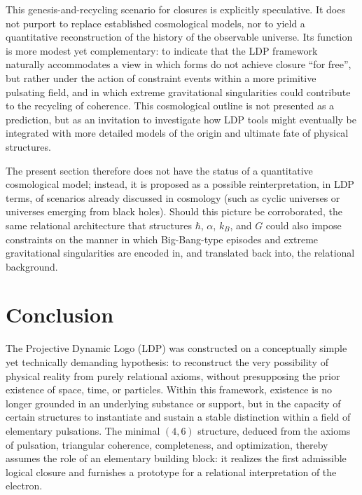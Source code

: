 \documentclass[11pt,a4paper]{article}
\begin{document}
This genesis-and-recycling scenario for closures is explicitly speculative. It does not purport to replace established cosmological models, nor to yield a quantitative reconstruction of the history of the observable universe. Its function is more modest yet complementary: to indicate that the LDP framework naturally accommodates a view in which forms do not achieve closure “for free”, but rather under the action of constraint events within a more primitive pulsating field, and in which extreme gravitational singularities could contribute to the recycling of coherence. This cosmological outline is not presented as a prediction, but as an invitation to investigate how LDP tools might eventually be integrated with more detailed models of the origin and ultimate fate of physical structures. 

The present section therefore does not have the status of a quantitative cosmological model; instead, it is proposed as a possible reinterpretation, in LDP terms, of scenarios already discussed in cosmology (such as cyclic universes or universes emerging from black holes). Should this picture be corroborated, the same relational architecture that structures \(\hbar\), \(\alpha\), \(k_{B}\), and \(G\) could also impose constraints on the manner in which Big-Bang-type episodes and extreme gravitational singularities are encoded in, and translated back into, the relational background.

\newpage

\section*{Conclusion}
The Projective Dynamic Logo (LDP) was constructed on a conceptually simple yet technically demanding hypothesis: to reconstruct the very possibility of physical reality from purely relational axioms, without presupposing the prior existence of space, time, or particles. Within this framework, existence is no longer grounded in an underlying substance or support, but in the capacity of certain structures to instantiate and sustain a stable distinction within a field of elementary pulsations. The minimal \((4,6)\) structure, deduced from the axioms of pulsation, triangular coherence, completeness, and optimization, thereby assumes the role of an elementary building block: it realizes the first admissible logical closure and furnishes a prototype for a relational interpretation of the electron.
\end{document}
